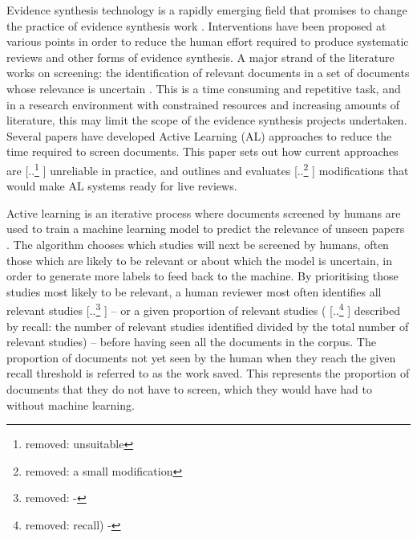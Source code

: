 \documentclass{bmcart}
\providecommand{\DIFadd}[1]{{\protect\color{blue} \sf #1}} %
\providecommand{\DIFdel}[1]{{\protect\color{red} [..\footnote{removed: #1} ]}} %
\providecommand{\DIFaddbegin}{} %
\providecommand{\DIFaddend}{} %
\providecommand{\DIFdelbegin}{} %
\providecommand{\DIFdelend}{} %
\newcommand{\DIFscaledelfig}{0.5}
\newlength{\DIFdelgraphicswidth} %
\newlength{\DIFdelgraphicsheight} %
\newcommand{\DIFaddincludegraphics}[2][]{{\color{blue}\fbox{\DIFOincludegraphics[#1]{#2}}}} %
\newcommand{\DIFdelincludegraphics}[2][]{%
\sbox{\DIFdelgraphicsbox}{\DIFOincludegraphics[#1]{#2}}%
\settoboxwidth{\DIFdelgraphicswidth}{\DIFdelgraphicsbox} %
\settoboxtotalheight{\DIFdelgraphicsheight}{\DIFdelgraphicsbox} %
\scalebox{\DIFscaledelfig}{%
\parbox[b]{\DIFdelgraphicswidth}{\usebox{\DIFdelgraphicsbox}\\[-\baselineskip] \rule{\DIFdelgraphicswidth}{0em}}\llap{\resizebox{\DIFdelgraphicswidth}{\DIFdelgraphicsheight}{%
\setlength{\unitlength}{\DIFdelgraphicswidth}%
\begin{picture}(1,1)%
\thicklines\linethickness{2pt} %
{\color[rgb]{1,0,0}\put(0,0){\framebox(1,1){}}}%
{\color[rgb]{1,0,0}\put(0,0){\line( 1,1){1}}}%
{\color[rgb]{1,0,0}\put(0,1){\line(1,-1){1}}}%
\end{picture}%
}\hspace*{3pt}}} %
} %
\DeclareRobustCommand{\DIFaddbegin}{\DIFOaddbegin \let\includegraphics\DIFaddincludegraphics} %
\DeclareRobustCommand{\DIFaddend}{\DIFOaddend \let\includegraphics\DIFOincludegraphics} %
\DeclareRobustCommand{\DIFdelbegin}{\DIFOdelbegin \let\includegraphics\DIFdelincludegraphics} %
\DeclareRobustCommand{\DIFdelend}{\DIFOaddend \let\includegraphics\DIFOincludegraphics} %
\begin{document}
	Evidence synthesis technology is a rapidly emerging field that promises to change the practice of evidence synthesis work \cite{Westgate2018}.
	Interventions have been proposed at various points in order to reduce the human effort required to produce systematic reviews and other forms of evidence synthesis.
	A major strand of the literature works on screening: the identification of relevant documents in a set of documents whose relevance is uncertain \cite{OMara-Eves2015}. 
	This is a time consuming and repetitive task, and in a research environment with constrained resources and increasing amounts of literature, this may limit the scope of the evidence synthesis projects undertaken.
	Several papers have developed Active Learning (AL) approaches \cite{miwa2014, Wallace2010a, Wallace2010, Jonnalagadda2013, Przybya2018} to reduce the time required to screen documents. This paper sets out how current approaches are  \DIFdelbegin \DIFdel{unsuitable }\DIFdelend \DIFaddbegin \DIFadd{unreliable }\DIFaddend in practice, and outlines and evaluates \DIFdelbegin \DIFdel{a small modification }\DIFdelend \DIFaddbegin \DIFadd{modifications }\DIFaddend that would make AL systems ready for live reviews.

	Active learning is an iterative process where documents screened by humans are used to train a machine learning model to predict the relevance of unseen papers \cite{Settles2009}.
	The algorithm chooses which studies will next be screened by humans, often those which are likely to be relevant or about which the model is uncertain, in order to generate more labels to feed back to the machine. 
	By prioritising those studies most likely to be relevant, a human reviewer most often identifies all relevant studies \DIFdelbegin \DIFdel{- }\DIFdelend \DIFaddbegin \DIFadd{-- }\DIFaddend or a given proportion of relevant studies (\DIFdelbegin \DIFdel{recall) - }\DIFdelend \DIFaddbegin \DIFadd{described by recall: the number of relevant studies identified divided by the total number of relevant studies) -- }\DIFaddend before having seen all the documents in the corpus. 
	The proportion of documents not yet seen by the human when they reach the given recall threshold is referred to as the work saved. This represents the proportion of documents that they do not have to screen, which they would have had to without machine learning.
\end{document}
